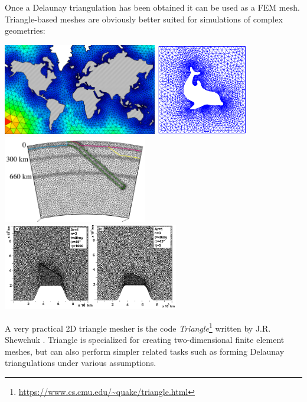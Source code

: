 Once a Delaunay triangulation has been obtained it can be used as a FEM mesh.  
Triangle-based meshes are obviously better suited for simulations of complex geometries:
\begin{center}
\includegraphics[height=4cm]{images/meshes/tr1}
\includegraphics[height=4cm]{images/meshes/dolfin}\\
\includegraphics[height=3.8cm]{images/meshes/gebk12}\cite{gebk12}
\includegraphics[height=3.8cm]{images/meshes/rost05a}\cite{rost05a}
\end{center}

A very practical 2D triangle mesher is the 
code {\sl Triangle}\footnote{\url{https://www.cs.cmu.edu/~quake/triangle.html}}
written by J.R. Shewchuk \cite{shew96,shew02,shew14}.
Triangle is specialized for creating two-dimensional finite element meshes, but can 
also perform simpler related tasks such as forming Delaunay triangulations under various assumptions.

